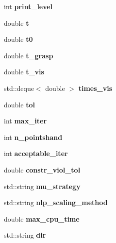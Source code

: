 \begin{DoxyCompactItemize}
\item 
int {\bfseries print\+\_\+level}\label{classGraspingModule_a244cb8f6f2b2294d2be164ee1518cc36}

\item 
double {\bfseries t}\label{classGraspingModule_a4f36c3ca4e343f62ec908768af45a3da}

\item 
double {\bfseries t0}\label{classGraspingModule_a70a4e9c60616c7e7c63b11594e73a6ac}

\item 
double {\bfseries t\+\_\+grasp}\label{classGraspingModule_aaf674331d6bbf84ea008566948c6dee2}

\item 
double {\bfseries t\+\_\+vis}\label{classGraspingModule_ae0cddf0f4c4e7d00197a1c45ff98f0e5}

\item 
std\+::deque$<$ double $>$ {\bfseries times\+\_\+vis}\label{classGraspingModule_a9a0dedfb6b400af32cd04a9eafd43dba}

\item 
double {\bfseries tol}\label{classGraspingModule_a521b7c66535fb4dac516a9ff58241f05}

\item 
int {\bfseries max\+\_\+iter}\label{classGraspingModule_a3f17b0601f067499b5f574fb8c6f937e}

\item 
int {\bfseries n\+\_\+pointshand}\label{classGraspingModule_aa4dff98eeb8125bc88613b15159cd26c}

\item 
int {\bfseries acceptable\+\_\+iter}\label{classGraspingModule_ab3821aa16b5021be595ac8b7db4d6cfb}

\item 
double {\bfseries constr\+\_\+viol\+\_\+tol}\label{classGraspingModule_a5529bf668b7ea95582ea238d5f50e3c2}

\item 
std\+::string {\bfseries mu\+\_\+strategy}\label{classGraspingModule_a64763408867f3cb6dc508c91f8cf220a}

\item 
std\+::string {\bfseries nlp\+\_\+scaling\+\_\+method}\label{classGraspingModule_aecc5738f9012849c9edaf35f479723b4}

\item 
double {\bfseries max\+\_\+cpu\+\_\+time}\label{classGraspingModule_a3dabf2eac967efb30b1b7bb9c91e41b3}

\item 
std\+::string {\bfseries dir}\label{classGraspingModule_a87c885eada6df4d622c92173d8a4ed2e}


\end{DoxyCompactItemize}
